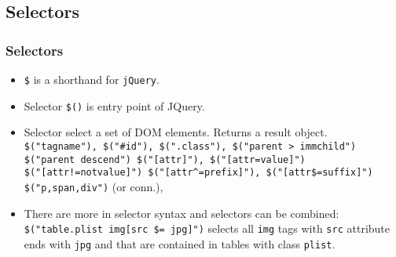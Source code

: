 \documentclass[trans,compress,xcolor=table]{beamer}
\begin{document}
\subsection*{Selectors}
\begin{frame}[fragile]
\frametitle{Selectors}
\begin{itemize}
\item \lstinline!$! is a shorthand for \lstinline!jQuery!.
\item Selector \lstinline!$()! is entry point of JQuery.
\item Selector select a set of DOM elements. Returns a result object.\\
	\lstinline!$("tagname"), $("#id"), $(".class"), $("parent > immchild")!\\
	\lstinline!$("parent descend") $("[attr]"), $("[attr=value]") !\\
	\lstinline{$("[attr!=notvalue]") $("[attr^=prefix]"), $("[attr$=suffix]") }\\
	\lstinline{$("p,span,div")} (or conn.), 
\item There are more in selector syntax and selectors can be combined:\\
\lstinline!$("table.plist img[src $= jpg]")! selects all \lstinline!img! tags
	with \lstinline!src! attribute ends with \lstinline!jpg! and that
	are contained in tables with class \lstinline!plist!.
\end{itemize}
\end{frame}
\end{document}
